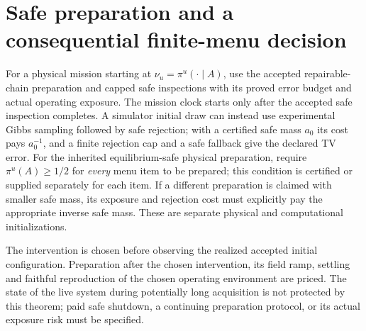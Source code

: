 \section{Safe preparation and a consequential finite-menu decision}

For a physical mission starting at $\nu_u=\pi^u(\cdot\mid A)$, use the
accepted repairable-chain preparation and capped safe inspections with its
proved error budget and actual operating exposure. The mission clock starts
only after the accepted safe inspection completes. A simulator initial
draw can instead use experimental Gibbs sampling followed by safe
rejection; with a certified safe mass $a_0$ its cost pays $a_0^{-1}$,
and a finite rejection cap and a safe fallback give the declared TV error.
For the inherited equilibrium-safe physical preparation, require
$\pi^u(A)\ge1/2$ for \emph{every} menu item to be prepared; this condition
is certified or supplied separately for each item. If a different
preparation is claimed with smaller safe mass, its exposure and rejection
cost must explicitly pay the appropriate inverse safe mass.
These are separate physical and computational initializations.

The intervention is chosen before observing the realized accepted initial
configuration. Preparation after the chosen intervention, its field ramp,
settling and faithful reproduction of the chosen operating environment are
priced. The state of the live system during potentially long acquisition
is not protected by this theorem; paid safe shutdown, a continuing
preparation protocol, or its actual exposure risk must be specified.

